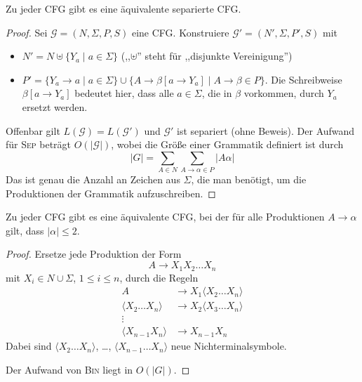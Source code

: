 {\begin{lemma}
  Zu jeder CFG gibt es eine äquivalente separierte CFG.
\end{lemma}
\begin{proof}
  Sei $\mathcal{G} = (N, \Sigma, P, S)$ eine CFG.
  Konstruiere $\mathcal{G}' = (N', \Sigma, P', S)$ mit
  \begin{itemize}
  \item $N' = N \uplus \{Y_a \mid a \in \Sigma \}$ (,,$\uplus$'' steht für ,,disjunkte Vereinigung'')
  \item $P' = \{Y_a \to a \mid a \in \Sigma \} \cup \{A \to \beta[a \to Y_a] \mid A \to \beta \in P \}$.
    Die Schreibweise $\beta[a\to Y_a]$ bedeutet hier, dass alle $a \in \Sigma$, die in $\beta$ vorkommen, durch $Y_a$ ersetzt werden.
  \end{itemize}
Offenbar gilt $L(\mathcal{G}) = L(\mathcal{G'})$ und $\mathcal{G}'$ ist separiert (ohne Beweis).
Der Aufwand für \textsc{Sep} beträgt $O(|\mathcal{G}|)$, wobei die
Größe einer Grammatik definiert ist durch
\begin{displaymath}
  |G| = \sum_{A \in N}\sum_{A \to \alpha \in P} |A\alpha|
\end{displaymath}
Das ist genau die Anzahl an Zeichen aus $\Sigma$, die man benötigt, um die Produktionen der Grammatik aufzuschreiben.
\end{proof}

\begin{lemma}
  Zu jeder CFG gibt es eine äquivalente CFG, bei der für alle Produktionen $A \to \alpha$ gilt, dass $|\alpha| \le 2$.
\end{lemma}
\begin{proof}
  Ersetze jede Produktion der Form 
  \begin{displaymath}
    A \to X_1X_2\ldots X_n
  \end{displaymath}
  mit $X_i \in N \cup \Sigma$, $1 \le i \le n$,
  durch die Regeln 
  \begin{align*}
    A &\to X_1\langle  X_2\ldots X_n \rangle \\
    \langle  X_2\ldots X_n \rangle & \to X_2\langle  X_3\ldots X_n \rangle \\
    \vdots \\
    \langle  X_{n-1}X_n \rangle & \to X_{n-1}X_n
  \end{align*}
  Dabei sind  $\langle  X_2\ldots X_n \rangle$, \ldots, $\langle  X_{n-1}\ldots X_n \rangle$ neue Nichterminalsymbole.

  Der Aufwand von \textsc{Bin} liegt in $O(|G|)$.
\end{proof}


}
